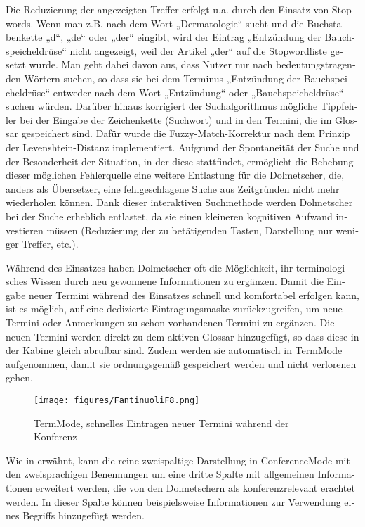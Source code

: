 \documentclass[output=paper]{LSP/langsci}
\begin{document}
\begin{otherlanguage}{ngerman}
Die Reduzierung der angezeigten Treffer erfolgt u.a. durch den Einsatz von Stopwords. Wenn man z.B. nach dem Wort „Dermatologie“ sucht und die Buchstabenkette „d“, „de“ oder „der“ eingibt, wird der Eintrag „Entzündung der Bauchspeicheldrüse“ nicht angezeigt, weil der Artikel „der“ auf die Stopwordliste gesetzt wurde. Man geht dabei davon aus, dass Nutzer nur nach bedeutungstragenden Wörtern suchen, so dass sie bei dem Terminus „Entzündung der Bauchspeicheldrüse“ entweder nach dem Wort „Entzündung“ oder „Bauchspeicheldrüse“ suchen würden. Darüber hinaus korrigiert der Suchalgorithmus mögliche Tippfehler bei der Eingabe der Zeichenkette (Suchwort) und in den Termini, die im Glossar gespeichert sind. Dafür wurde die Fuzzy-Match-Korrektur nach dem Prinzip der Levenshtein-Distanz implementiert. Aufgrund der Spontaneität der Suche und der Besonderheit der Situation, in der diese stattfindet, ermöglicht die Behebung dieser möglichen Fehlerquelle eine weitere Entlastung für die Dolmetscher, die, anders als Übersetzer, eine fehlgeschlagene Suche aus Zeitgründen nicht mehr wiederholen können. Dank dieser interaktiven Suchmethode werden Dolmetscher bei der Suche erheblich entlastet, da sie einen kleineren kognitiven Aufwand investieren müssen (Reduzierung der zu betätigenden Tasten, Darstellung nur weniger Treffer, etc.).

Während des Einsatzes haben Dolmetscher oft die Möglichkeit, ihr terminologisches Wissen durch neu gewonnene Informationen zu ergänzen. Damit die Eingabe neuer Termini während des Einsatzes schnell und komfortabel erfolgen kann, ist es möglich, auf eine dedizierte Eintragungsmaske zurückzugreifen, um neue Termini oder Anmerkungen zu schon vorhandenen Termini zu ergänzen. Die neuen Termini werden direkt zu dem aktiven Glossar hinzugefügt, so dass diese in der Kabine gleich abrufbar sind. Zudem werden sie automatisch in TermMode aufgenommen, damit sie ordnungsgemäß gespeichert werden und nicht verlorenen gehen.

\begin{figure}
\texttt{[image: figures/FantinuoliF8.png]}
\caption{TermMode, schnelles Eintragen neuer Termini während der Konferenz}
\label{fig:fantinuoli:8}
\end{figure} 

Wie in  erwähnt, kann die reine zweispaltige Darstellung in ConferenceMode mit den zweisprachigen Benennungen um eine dritte Spalte mit allgemeinen Informationen erweitert werden, die von den Dolmetschern als konferenzrelevant erachtet werden. In dieser Spalte können beispielsweise Informationen zur Verwendung eines Begriffs hinzugefügt werden.


\end{otherlanguage}
\end{document}
